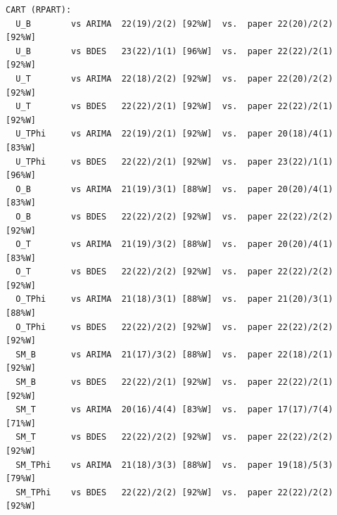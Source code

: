 \begin{verbatim}
CART (RPART):
  U_B        vs ARIMA  22(19)/2(2) [92%W]  vs.  paper 22(20)/2(2) [92%W]
  U_B        vs BDES   23(22)/1(1) [96%W]  vs.  paper 22(22)/2(1) [92%W]
  U_T        vs ARIMA  22(18)/2(2) [92%W]  vs.  paper 22(20)/2(2) [92%W]
  U_T        vs BDES   22(22)/2(1) [92%W]  vs.  paper 22(22)/2(1) [92%W]
  U_TPhi     vs ARIMA  22(19)/2(1) [92%W]  vs.  paper 20(18)/4(1) [83%W]
  U_TPhi     vs BDES   22(22)/2(1) [92%W]  vs.  paper 23(22)/1(1) [96%W]
  O_B        vs ARIMA  21(19)/3(1) [88%W]  vs.  paper 20(20)/4(1) [83%W]
  O_B        vs BDES   22(22)/2(2) [92%W]  vs.  paper 22(22)/2(2) [92%W]
  O_T        vs ARIMA  21(19)/3(2) [88%W]  vs.  paper 20(20)/4(1) [83%W]
  O_T        vs BDES   22(22)/2(2) [92%W]  vs.  paper 22(22)/2(2) [92%W]
  O_TPhi     vs ARIMA  21(18)/3(1) [88%W]  vs.  paper 21(20)/3(1) [88%W]
  O_TPhi     vs BDES   22(22)/2(2) [92%W]  vs.  paper 22(22)/2(2) [92%W]
  SM_B       vs ARIMA  21(17)/3(2) [88%W]  vs.  paper 22(18)/2(1) [92%W]
  SM_B       vs BDES   22(22)/2(1) [92%W]  vs.  paper 22(22)/2(1) [92%W]
  SM_T       vs ARIMA  20(16)/4(4) [83%W]  vs.  paper 17(17)/7(4) [71%W]
  SM_T       vs BDES   22(22)/2(2) [92%W]  vs.  paper 22(22)/2(2) [92%W]
  SM_TPhi    vs ARIMA  21(18)/3(3) [88%W]  vs.  paper 19(18)/5(3) [79%W]
  SM_TPhi    vs BDES   22(22)/2(2) [92%W]  vs.  paper 22(22)/2(2) [92%W]

\end{verbatim}
\endgroup
